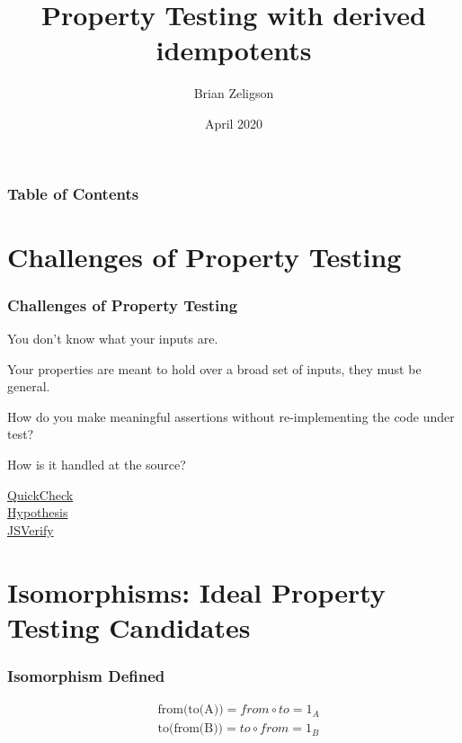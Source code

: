 \documentclass{beamer}
\title{Property Testing with derived idempotents}
\author{Brian Zeligson}
\date{April 2020}
\begin{document}
\frame{\titlepage}

\begin{frame}
\frametitle{Table of Contents}
\tableofcontents
\end{frame}

\section{Challenges of Property Testing}

\begin{frame}
\frametitle{Challenges of Property Testing}

You don't know what your inputs are. \\ \pause
\medskip

Your properties are meant to hold over a broad set of inputs, they must be general. \\ \pause
\medskip

How do you make meaningful assertions without re-implementing the code under test? \\ \pause
\medskip

How is it handled at the source? \\
\medskip

\href{http://www.cse.chalmers.se/~rjmh/QuickCheck/manual.html}{QuickCheck} \\
\href{https://hypothesis.readthedocs.io/en/latest/}{Hypothesis} \\
\href{https://jsverify.github.io/}{JSVerify} \\

\end{frame}


\section{Isomorphisms: Ideal Property Testing Candidates}
\begin{frame}[fragile]
\frametitle{Isomorphism Defined}
\medskip
\begin{equation*}
\begin{aligned}
& \text{from(to(A))} = from \circ to = 1_A \\
& \text{to(from(B))} = to \circ from = 1_B
\end{aligned}
\end{equation*}
\end{frame}
\end{document}
